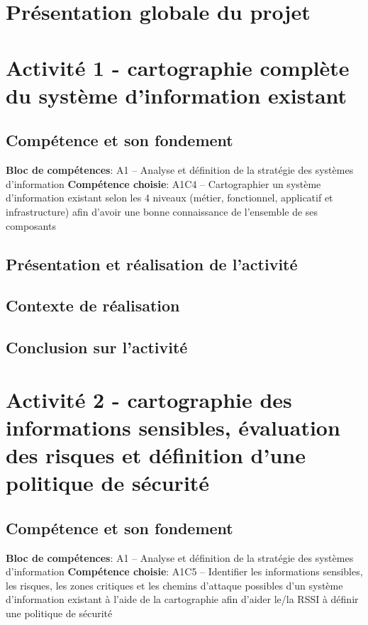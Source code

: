 \documentclass[a4paper, 11pt]{report}
\begin{document}
\section{Présentation globale du projet}


\section{Activité 1 - cartographie complète du système d'information existant}
\subsection{Compétence et son fondement}
\textbf{Bloc de compétences}: A1 – Analyse et définition de la stratégie des systèmes d’information
\newline
\textbf{Compétence choisie}: A1C4 – Cartographier un système d’information existant selon les 4 niveaux (métier, fonctionnel, applicatif et infrastructure) afin d’avoir une bonne connaissance de l’ensemble de ses composants
\subsection{Présentation et réalisation de l'activité}
\subsection{Contexte de réalisation}
\subsection{Conclusion sur l'activité}

\section{Activité 2 - cartographie des informations sensibles, évaluation des risques et définition d'une politique de sécurité}
\subsection{Compétence et son fondement}
\textbf{Bloc de compétences}: A1 – Analyse et définition de la stratégie des systèmes d’information
\newline
\textbf{Compétence choisie}: A1C5 – Identifier les informations sensibles, les risques, les zones critiques et les chemins d’attaque possibles d’un système d’information existant à l’aide de la cartographie afin d’aider le/la RSSI à définir une politique de sécurité
\end{document}
